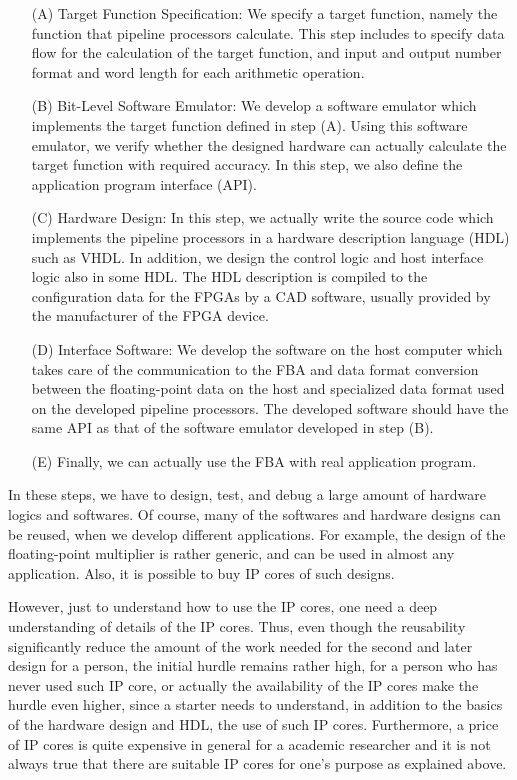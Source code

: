 \documentclass{llncs}
\begin{document}
\begin{itemize}
\setlength{\itemsep}{6pt}

\item[(A)] Target Function Specification:
We specify a target function, namely the function that pipeline
processors calculate. This step includes to specify 
data flow for the calculation of the target function, 
and input and output number format and word length for each arithmetic operation. 

\item[(B)] Bit-Level Software Emulator:
We develop a software emulator which implements the target function
defined in step (A). Using this software emulator, we verify
whether the designed hardware can actually calculate the target
function with required accuracy. In this step, we also define the
application program interface (API). 

\item[(C)]  Hardware Design:
In this step, we actually write the source code which implements the
pipeline processors in a hardware description language (HDL) such as VHDL.
In addition, we design the control logic and host interface logic also
in some HDL. The HDL description is compiled to the configuration data
for the FPGAs by a CAD software, usually provided by the
manufacturer of the FPGA device.

\item[(D)] Interface Software:
We develop the software on the host computer which takes care of the
communication to the FBA and data format conversion between the
floating-point data on the host and specialized data format used on
the developed pipeline processors. The developed software should have
the same API as that of the software emulator developed in step (B).

\item[(E)] Finally, we can actually use the FBA with
real application program.
\end{itemize}

In these steps, we have to design, test, and debug a large amount of
hardware logics and softwares. Of course, many of the softwares and
hardware designs can be reused, when we develop different
applications. For example, the design of the floating-point multiplier
is rather generic, and can be used in almost any application. Also, it
is possible to buy IP cores of such designs.

However, just to understand how to use the IP cores, one need a deep understanding
of details of the IP cores. Thus, even
though the reusability significantly reduce the amount of the work
needed for the second and later design for a person, the initial
hurdle remains rather high, for a person who has never used 
such IP core, or actually the availability of the IP cores make the hurdle
even higher, since a starter needs to understand, in addition to the
basics of the hardware design and HDL, the use of such IP cores.
Furthermore, a price of IP cores is quite expensive in general for a academic 
researcher and it is not always true that there are suitable IP cores
for one's purpose as explained above.
\end{document}

